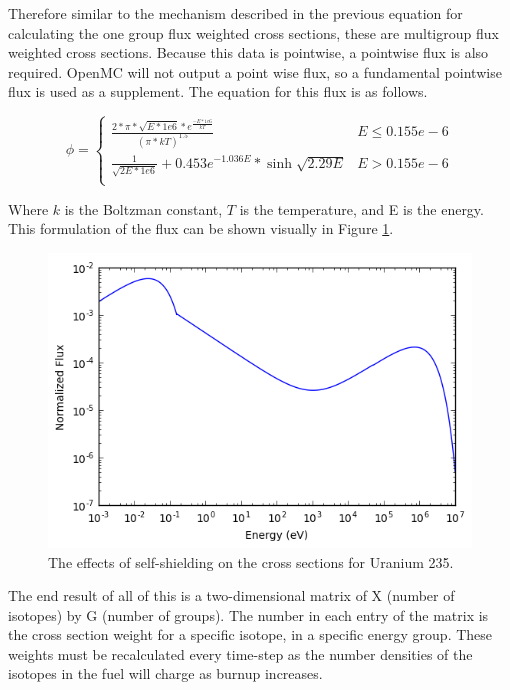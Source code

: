 \documentclass{article}
\begin{document}
Therefore similar to the mechanism described in the previous equation for calculating the one group flux weighted cross sections, these are multigroup flux weighted cross sections. Because this data is pointwise, a pointwise flux is also required. OpenMC will not output a point wise flux, so a fundamental pointwise flux is used as a supplement. The equation for this flux is as follows.

\large

\[ \phi = \begin{cases}
      \frac{2*\pi*\sqrt{E*1e6}*e^{\frac{-E*1e6}{kT}}}{(\pi*kT)^1.5} & E\leq 0.155e-6 \\
      \frac{1}{\sqrt{2E*1e6}} + 0.453e^{-1.036E}*\sinh{\sqrt{2.29E}} & E > 0.155e-6 \\
   \end{cases}
\]

Where $k$ is the Boltzman constant, $T$ is the temperature, and E is the energy. This formulation of the flux can be shown visually in Figure \ref{fig:therm}.
\begin{figure}[h]
  \center
  \includegraphics[scale=0.8]{thermspec.png}
  \caption{The effects of self-shielding on the cross sections for Uranium 235.}
  \label{fig:therm}
\end{figure}

The end result of all of this is a two-dimensional matrix of X (number of isotopes) by G (number of groups). The number in each entry of the matrix is the cross section weight for a specific isotope, in a specific energy group. These weights must be recalculated every time-step as the number densities of the isotopes in the fuel will charge as burnup increases.
\end{document}
